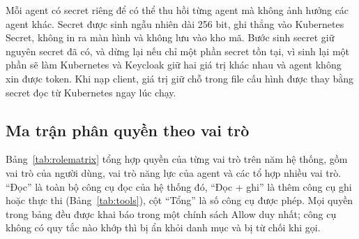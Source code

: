 \documentclass[a4paper]{article}
\begin{document}
Mỗi agent có secret riêng để có thể thu hồi từng agent mà không ảnh hưởng các agent khác. Secret được sinh ngẫu nhiên dài 256 bit, ghi thẳng vào Kubernetes Secret, không in ra màn hình và không lưu vào kho mã. Bước sinh secret giữ nguyên secret đã có, và dừng lại nếu chỉ một phần secret tồn tại, vì sinh lại một phần sẽ làm Kubernetes và Keycloak giữ hai giá trị khác nhau và agent không xin được token. Khi nạp client, giá trị giữ chỗ trong file cấu hình được thay bằng secret đọc từ Kubernetes ngay lúc chạy.

\subsection{Ma trận phân quyền theo vai trò}\label{sec:rolematrix}

Bảng~\ref{tab:rolematrix} tổng hợp quyền của từng vai trò trên năm hệ thống, gồm vai trò của người dùng, vai trò năng lực của agent và các tổ hợp nhiều vai trò. ``Đọc'' là toàn bộ công cụ đọc của hệ thống đó, ``Đọc + ghi'' là thêm công cụ ghi hoặc thực thi (Bảng~\ref{tab:tools}), cột ``Tổng'' là số công cụ được phép. Mọi quyền trong bảng đều được khai báo trong một chính sách Allow duy nhất; công cụ không có quy tắc nào khớp thì bị ẩn khỏi danh mục và bị từ chối khi gọi.
\end{document}

